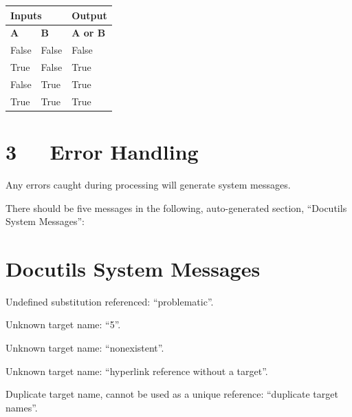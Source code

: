 \documentclass[10pt,a4paper,english]{article}
\newlength{\locallinewidth}
\begin{document}
\begin{longtable}[c]{|p{0.07\locallinewidth}|p{0.07\locallinewidth}|p{0.09\locallinewidth}|}
\hline
\multicolumn{2}{|l|}{\textbf{
Inputs
}} & \textbf{
Output
} \\
\hline
\textbf{
A
} & \textbf{
B
} & \textbf{
A or B
} \\
\hline
\endhead

False
 & 
False
 & 
False
 \\
\hline

True
 & 
False
 & 
True
 \\
\hline

False
 & 
True
 & 
True
 \\
\hline

True
 & 
True
 & 
True
 \\
\hline
\end{longtable}



\hypertarget{error-handling}{}
\section*{3~~~Error Handling}

Any errors caught during processing will generate system messages.

There should be five messages in the following, auto-generated
section, ``Docutils System Messages'':



\section*{Docutils System Messages}

Undefined substitution referenced: ``problematic''.


Unknown target name: ``5''.


Unknown target name: ``nonexistent''.


Unknown target name: ``hyperlink reference without a target''.


Duplicate target name, cannot be used as a unique reference: ``duplicate target names''.
\end{document}
